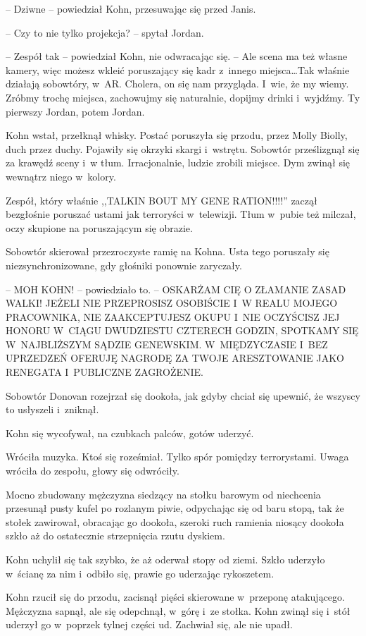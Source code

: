 \documentclass[oneside,polish,11pt,sfheadings]{mwbk}
\begin{document}
-- Dziwne -- powiedział Kohn, przesuwając się przed Janis.

-- Czy to nie tylko projekcja? -- spytał Jordan.

-- Zespół tak -- powiedział Kohn, nie odwracając się. -- Ale scena ma też
własne kamery, więc możesz wkleić poruszający się kadr z~innego
miejsca\ldots Tak właśnie działają sobowtóry, w~AR. Cholera, on się nam
przygląda. I~wie, że my wiemy. Zróbmy trochę miejsca, zachowujmy się
naturalnie, dopijmy drinki i~wyjdźmy. Ty pierwszy Jordan, potem Jordan.

Kohn wstał, przełknął whisky. Postać poruszyła się przodu, przez Molly
Biolly, duch przez duchy. Pojawiły się okrzyki skargi i~wstrętu.
Sobowtór prześlizgnął się za krawędź sceny i~w tłum. Irracjonalnie,
ludzie zrobili miejsce. Dym zwinął się wewnątrz niego w~kolory.

Zespół, który właśnie ,,TALKIN BOUT MY GENE RATION!!!!'' zaczął bezgłośnie
poruszać ustami jak terroryści w~telewizji. Tłum w~pubie też milczał,
oczy skupione na poruszającym się obrazie.

Sobowtór skierował przezroczyste ramię na Kohna. Usta tego poruszały się
niezsynchronizowane, gdy głośniki ponownie zaryczały.

-- MOH KOHN! -- powiedziało to. -- OSKARŻAM CIĘ O ZŁAMANIE ZASAD WALKI!
JEŻELI NIE PRZEPROSISZ OSOBIŚCIE I~W REALU MOJEGO PRACOWNIKA, NIE
ZAAKCEPTUJESZ OKUPU I~NIE OCZYŚCISZ JEJ HONORU W~CIĄGU DWUDZIESTU
CZTERECH GODZIN, SPOTKAMY SIĘ W~NAJBLIŻSZYM SĄDZIE GENEWSKIM. W~MIĘDZYCZASIE I~BEZ UPRZEDZEŃ OFERUJĘ NAGRODĘ ZA TWOJE ARESZTOWANIE JAKO
RENEGATA I~PUBLICZNE ZAGROŻENIE.

Sobowtór Donovan rozejrzał się dookoła, jak gdyby chciał się upewnić, że
wszyscy to usłyszeli i~zniknął.

Kohn się wycofywał, na czubkach palców, gotów uderzyć.

Wróciła muzyka. Ktoś się roześmiał. Tylko spór pomiędzy terrorystami.
Uwaga wróciła do zespołu, głowy się odwróciły.

Mocno zbudowany mężczyzna siedzący na stołku barowym od niechcenia
przesunął pusty kufel po rozlanym piwie, odpychając się od baru stopą,
tak że stołek zawirował, obracając go dookoła, szeroki ruch ramienia
niosący dookoła szkło aż do ostatecznie strzepnięcia rzutu dyskiem.

Kohn uchylił się tak szybko, że aż oderwał stopy od ziemi. Szkło
uderzyło w~ścianę za nim i~odbiło się, prawie go uderzając rykoszetem.

Kohn rzucił się do przodu, zacisnął pięści skierowane w~przeponę
atakującego. Mężczyzna sapnął, ale się odepchnął, w~górę i~ze stołka.
Kohn zwinął się i~stół uderzył go w~poprzek tylnej części ud. Zachwiał
się, ale nie upadł.
\end{document}
